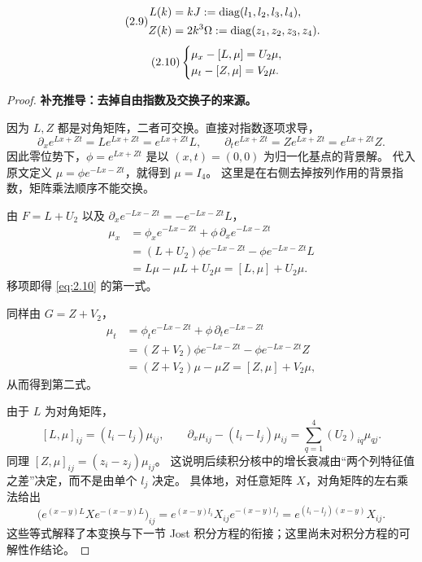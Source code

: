 \begin{equation}
\originaleq{2.9}
\begin{aligned}
L(k)&=kJ:=\diag(l_1,l_2,l_3,l_4),\\
Z(k)&=2k^3\Omega:=\diag(z_1,z_2,z_3,z_4).
\end{aligned}
\end{equation}
\begin{equation}
\originaleq{2.10}
\begin{cases}
\mu_x-[L,\mu]=U_2\mu,\\
\mu_t-[Z,\mu]=V_2\mu.
\end{cases}
\end{equation}

\begin{proof}
\textbf{补充推导：去掉自由指数及交换子的来源。}

因为 $L,Z$ 都是对角矩阵，二者可交换。直接对指数逐项求导，
\[
\partial_xe^{Lx+Zt}=Le^{Lx+Zt}=e^{Lx+Zt}L,\qquad
\partial_te^{Lx+Zt}=Ze^{Lx+Zt}=e^{Lx+Zt}Z.
\]
因此零位势下，$\phi=e^{Lx+Zt}$ 是以 $(x,t)=(0,0)$ 为归一化基点的背景解。
代入原文定义 $\mu=\phi e^{-Lx-Zt}$，就得到 $\mu=I_4$。
这里是在右侧去掉按列作用的背景指数，矩阵乘法顺序不能交换。

由 $F=L+U_2$ 以及 $\partial_xe^{-Lx-Zt}=-e^{-Lx-Zt}L$，
\begin{align*}
\mu_x
&=\phi_xe^{-Lx-Zt}+\phi\,\partial_xe^{-Lx-Zt}\\
&=(L+U_2)\phi e^{-Lx-Zt}-\phi e^{-Lx-Zt}L\\
&=L\mu-\mu L+U_2\mu=[L,\mu]+U_2\mu.
\end{align*}
移项即得 \eqref{eq:2.10} 的第一式。

同样由 $G=Z+V_2$，
\begin{align*}
\mu_t
&=\phi_te^{-Lx-Zt}+\phi\,\partial_te^{-Lx-Zt}\\
&=(Z+V_2)\phi e^{-Lx-Zt}-\phi e^{-Lx-Zt}Z\\
&=(Z+V_2)\mu-\mu Z=[Z,\mu]+V_2\mu,
\end{align*}
从而得到第二式。

由于 $L$ 为对角矩阵，
\[
[L,\mu]_{ij}=(l_i-l_j)\mu_{ij},\qquad
\partial_x\mu_{ij}-(l_i-l_j)\mu_{ij}
=\sum\limits_{q=1}^4(U_2)_{iq}\mu_{qj}.
\]
同理 $[Z,\mu]_{ij}=(z_i-z_j)\mu_{ij}$。
这说明后续积分核中的增长衰减由“两个列特征值之差”决定，而不是由单个 $l_j$ 决定。
具体地，对任意矩阵 $X$，对角矩阵的左右乘法给出
\[
\bigl(e^{(x-y)L}Xe^{-(x-y)L}\bigr)_{ij}
=e^{(x-y)l_i}X_{ij}e^{-(x-y)l_j}
=e^{(l_i-l_j)(x-y)}X_{ij}.
\]
这些等式解释了本变换与下一节 Jost 积分方程的衔接；这里尚未对积分方程的可解性作结论。
\end{proof}


